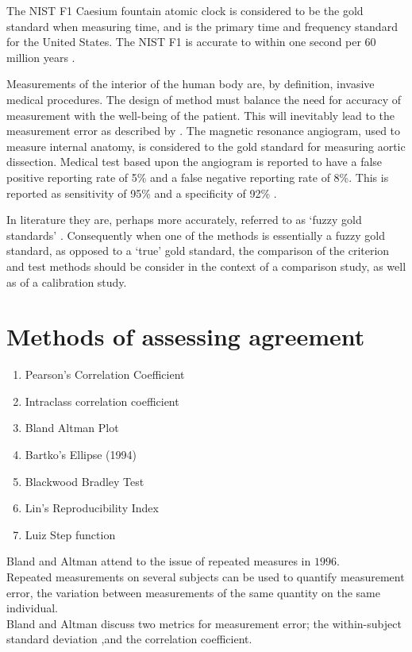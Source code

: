 \documentclass[12pt, a4paper]{report}
\theoremstyle{plain}
\theoremstyle{definition}
\theoremstyle{remark}
\begin{document}
	
	The NIST F1 Caesium fountain atomic clock is considered to be the
	gold standard when measuring time, and is the primary time and
	frequency standard for the United States. The NIST F1 is accurate
	to within one second per 60 million years \citep{NIST}.
	
	Measurements of the interior of the human body are, by definition,
	invasive medical procedures. The design of method must balance the
	need for accuracy of measurement with the well-being of the
	patient. This will inevitably lead to the measurement error as
	described by \citet{DunnSEME}. The magnetic resonance angiogram,
	used to measure internal anatomy,  is considered to the gold
	standard for measuring aortic dissection. Medical test based upon
	the angiogram is reported to have a false positive reporting rate
	of 5\% and a false negative reporting rate of 8\%. This is
	reported as sensitivity of 95\% and a specificity of 92\%
	\citep{ACR}.
	
	In literature they are, perhaps more accurately, referred to as
	`fuzzy gold standards' \citep{phelps}. Consequently when one of the methods is
	essentially a fuzzy gold standard, as opposed to a `true' gold
	standard, the comparison of the criterion and test methods should
	be consider in the context of a comparison study, as well as of a
	calibration study.
	
	\newpage
	
	\section{Methods of assessing agreement}
	
	\begin{enumerate}
		\item Pearson's Correlation Coefficient\item Intraclass
		correlation coefficient \item Bland Altman Plot \item Bartko's
		Ellipse (1994) \item Blackwood Bradley Test \item Lin's
		Reproducibility Index \item Luiz Step function
	\end{enumerate}
	
	Bland and Altman attend to the issue of repeated measures in
	$1996$.
	\\
	Repeated measurements on several subjects can be used to quantify
	measurement error, the variation between measurements of the same
	quantity on the same individual.
	\\
	Bland and Altman discuss two metrics for measurement error; the
	within-subject standard deviation ,and the correlation
	coefficient.
	
\end{document}
